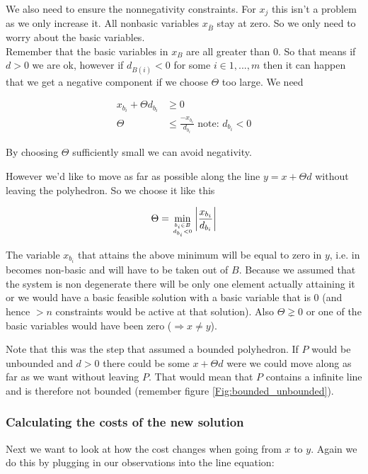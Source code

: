 We also need to ensure the nonnegativity constraints. For $x_j$ this isn't a problem as we only increase it. All nonbasic variables $x_{\bar B}$ stay at zero. So we only need to worry about the basic variables. \\ 
Remember that the basic variables in $x_B$ are all greater than 0. 
So that means if $d>0$ we are ok, however if $d_{B(i)} <0$ for some $i \in {1,...,m}$ then it can happen that we get a negative component if we choose $\Theta$ too large. We need 

\begin{center}
\begin{align*}
x_{b_i} +\Theta d_{b_i} & \geq 0\\ %
\Theta &\leq \frac{-x_{b_i}}{d_{b_i}} \text{\ note: }d_{b_i}<0
\end{align*}
\end{center}

By choosing $\Theta$ sufficiently small we can avoid negativity. 

However we'd like to move as far as possible along the line $y=x+\Theta d$ without leaving the polyhedron. So we choose it like this

\[\Theta = \min_{{b_i\in B}\atop {d_{b_i} <0}} \left| \frac{x_{b_i}}{d_{b_i}}\right |\]

The variable $x_{b_i}$ that attains the above minimum will be equal to zero in $y$, i.e. in becomes non-basic and will have to be taken out of $B$. Because we assumed that the system is non degenerate there will be only one element actually attaining it or we would have a basic feasible solution with a basic variable that is 0 (and hence $>n$ constraints would be active at that solution). Also $\Theta \gneq 0$ or one of the basic variables would have been zero ($\Rightarrow x\neq y$).

Note that this was the step that assumed a bounded polyhedron. If $P$ would be unbounded and $d>0$ there could be some $x+\Theta d$ were we could move along as far as we want without leaving $P$. That would mean that $P$ contains a infinite line and is therefore not bounded (remember figure \ref{Fig:bounded_unbounded}).

\subsubsection*{Calculating the costs of the new solution}
Next we want to look at how the cost changes when going from $x$ to $y$. Again we do this by plugging in our observations into the line equation:

